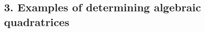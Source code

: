 \documentclass[twoside,openright]{article}
\newlength{\oldjot}
\begin{document}



\subsection*{3. Examples of determining algebraic quadratrices}
\end{document}
